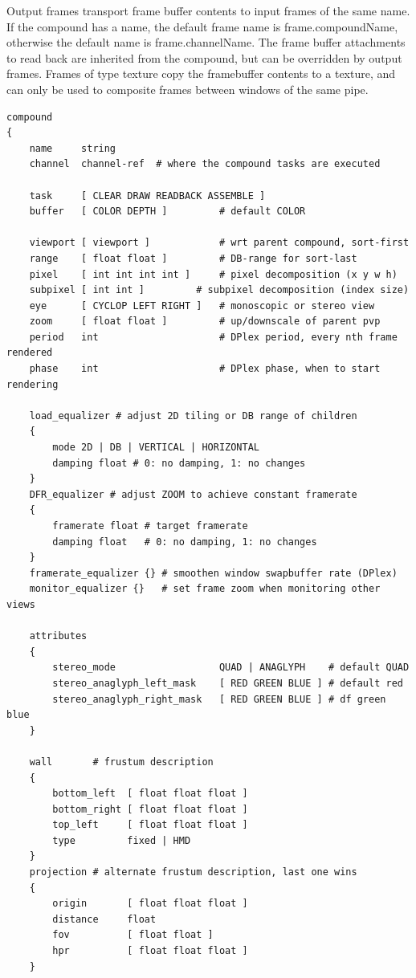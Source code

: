 \documentclass[10pt,a4]{scrartcl}
\begin{document}
Output frames transport frame buffer contents to input frames of the
same name. If the compound has a name, the default frame name is
\textsf{frame.compoundName}, otherwise the default name is
\textsf{frame.channelName}. The frame buffer attachments to read back
are inherited from the compound, but can be overridden by output
frames. Frames of type \textsf{texture} copy the framebuffer contents to
a texture, and can only be used to composite frames between windows of
the same pipe.

{\footnotesize\begin{lstlisting}
compound
{
    name     string
    channel  channel-ref  # where the compound tasks are executed

    task     [ CLEAR DRAW READBACK ASSEMBLE ]
    buffer   [ COLOR DEPTH ]         # default COLOR

    viewport [ viewport ]            # wrt parent compound, sort-first
    range    [ float float ]         # DB-range for sort-last
    pixel    [ int int int int ]     # pixel decomposition (x y w h)
    subpixel [ int int ]	     # subpixel decomposition (index size)
    eye      [ CYCLOP LEFT RIGHT ]   # monoscopic or stereo view
    zoom     [ float float ]         # up/downscale of parent pvp
    period   int                     # DPlex period, every nth frame rendered
    phase    int                     # DPlex phase, when to start rendering

    load_equalizer # adjust 2D tiling or DB range of children
    {
        mode 2D | DB | VERTICAL | HORIZONTAL
        damping float # 0: no damping, 1: no changes
    }
    DFR_equalizer # adjust ZOOM to achieve constant framerate
    {
        framerate float # target framerate
        damping float   # 0: no damping, 1: no changes
    }
    framerate_equalizer {} # smoothen window swapbuffer rate (DPlex)
    monitor_equalizer {}   # set frame zoom when monitoring other views

    attributes
    {
        stereo_mode                  QUAD | ANAGLYPH    # default QUAD
        stereo_anaglyph_left_mask    [ RED GREEN BLUE ] # default red
        stereo_anaglyph_right_mask   [ RED GREEN BLUE ] # df green blue
    }

    wall       # frustum description
    {
        bottom_left  [ float float float ]
        bottom_right [ float float float ]
        top_left     [ float float float ]
        type         fixed | HMD
    }
    projection # alternate frustum description, last one wins
    {
        origin       [ float float float ]
        distance     float
        fov          [ float float ]
        hpr          [ float float float ]
    }
    

\end{lstlisting}}
\end{document}
